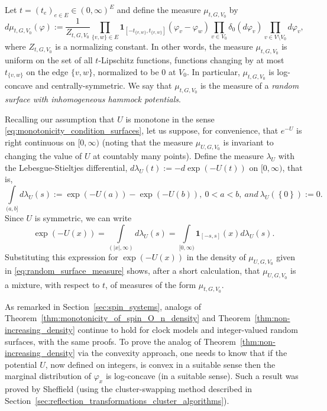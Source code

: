 \documentclass[english]{article}
\theoremstyle{plain}
\theoremstyle{plain}
\begin{document}
Let $t = (t_e)_{e\in E}\in (0,\infty)^E$ and define the measure $\mu_{t,G,V_0}$ by
\begin{equation}\label{hammock_measure}
 d\mu_{t,G,V_0}\left(\varphi\right):=\frac{1}{Z_{t,G,V_0}}\prod\limits _{\{v,w\}\in E}\mathbf{1}_{\left[-t_{\{v,w\}},t_{\{v,w\}}\right]}
 \left(\varphi_{v}-\varphi_{w}\right)\prod_{v\in V_0}\delta_{0}\left(d\varphi_{v}\right)\prod\limits _{v\in V\setminus
 V_0}d\varphi_{v},
\end{equation}
where $Z_{t,G,V_0}$ is a normalizing constant. In other words, the measure $\mu_{t,G,V_0}$ is uniform on the set of all $t$-Lipschitz functions, functions changing by at most $t_{\{v,w\}}$ on the edge $\{v,w\}$, normalized to be $0$ at $V_0$. In particular, $\mu_{t,G,V_0}$ is log-concave and centrally-symmetric. We say that $\mu_{t,G,V_0}$ is the measure of a \emph{random surface with inhomogeneous hammock potentials}.

Recalling our assumption that $U$ is monotone in the sense \eqref{eq:monotonicity_condition_surfaces}, let us suppose, for convenience, that $e^{-U}$ is right continuous on
$[0,\infty)$ (noting that the measure $\mu_{U,G,V_0}$ is invariant to
changing the value of $U$ at countably many points). Define the
measure $\lambda_U$ with the Lebesgue-Stieltjes differential,
$d\lambda_U(t):=-d\exp\left(-U(t)\right)$ on $[0,\infty)$, that is,
\[
\int\limits_{(a,b]}d\lambda
_U(s):=\exp\left(-U(a)\right)-\exp\left(-U(b)\right),~ 0<a<b,~and~
\lambda_{U}\left(\left\{0\right\}\right):=0.
\]
Since $U$ is symmetric, we can write
\[
\exp\left(-U\left(x\right)\right)=\int\limits
_{(|x|,\infty)}d\lambda_{U}(s)=
\int\limits_{[0,\infty)}\mathbf{1}_{\left[-s,s\right]}\left(x\right)d\lambda_{U}(s).
\]
Substituting this expression for $\exp\left(-U\left(x\right)\right)$ in the density of $\mu_{U,G,V_0}$ given in \eqref{eq:random_surface_measure} shows, after a short calculation, that $\mu_{U,G,V_0}$ is a mixture, with respect to $t$, of measures of the form $\mu_{t,G,V_0}$.

As remarked in Section~\ref{sec:spin_systems}, analogs of Theorem~\ref{thm:monotonicity_of_spin_O_n_density} and Theorem~\ref{thm:non-increasing_density} continue to hold for clock models and integer-valued random surfaces, with the same proofs. To prove the analog of Theorem~\ref{thm:non-increasing_density} via the convexity approach, one needs to know that if the potential $U$, now defined on integers, is convex in a suitable sense then the marginal distribution of $\varphi_x$ is log-concave (in a suitable sense). Such a result was proved by Sheffield \cite[Lemma
8.2.4]{sheffield2005random} (using the cluster-swapping method described in Section~\ref{sec:reflection_transformations_cluster_algorithms}).
\end{document}
